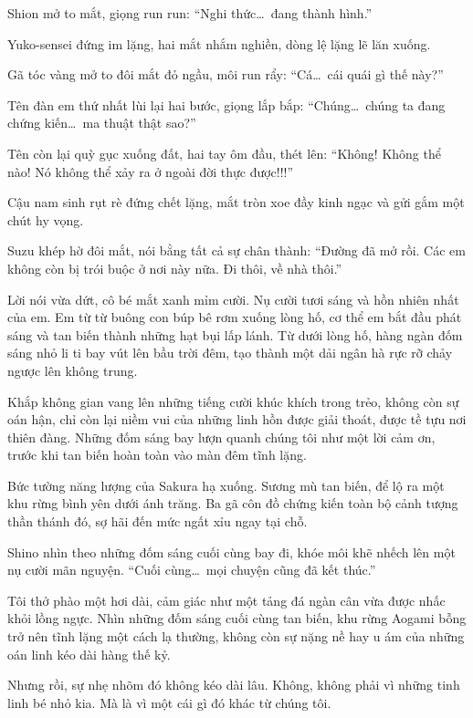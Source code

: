\documentclass[../main.tex]{subfiles}
\begin{document}
Shion mở to mắt, giọng run run: ``Nghi thức\dots\ đang thành hình.''

Yuko-sensei đứng im lặng, hai mắt nhắm nghiền, dòng lệ lặng lẽ lăn xuống.

Gã tóc vàng mở to đôi mắt đỏ ngầu, môi run rẩy: ``Cá\dots\ cái quái gì thế này?''

Tên đàn em thứ nhất lùi lại hai bước, giọng lắp bắp: ``Chúng\dots\ chúng ta đang chứng kiến\dots\ ma thuật thật sao?''

Tên còn lại quỳ gục xuống đất, hai tay ôm đầu, thét lên: ``Không! Không thể nào! Nó không thể xảy ra ở ngoài đời thực được!!!''

Cậu nam sinh rụt rè đứng chết lặng, mắt tròn xoe đầy kinh ngạc và gửi gắm một chút hy vọng.

Suzu khép hờ đôi mắt, nói bằng tất cả sự chân thành: ``Đường đã mở rồi. Các em không còn bị trói buộc ở nơi này nữa. Đi thôi, về nhà thôi.''

Lời nói vừa dứt, cô bé mắt xanh mỉm cười. Nụ cười tươi sáng và hồn nhiên nhất của em. Em từ từ buông con búp bê rơm xuống lòng hố, cơ thể em bắt đầu phát sáng và tan biến thành những hạt bụi lấp lánh. Từ dưới lòng hố, hàng ngàn đốm sáng nhỏ li ti bay vút lên bầu trời đêm, tạo thành một dải ngân hà rực rỡ chảy ngược lên không trung.

Khắp không gian vang lên những tiếng cười khúc khích trong trẻo, không còn sự oán hận, chỉ còn lại niềm vui của những linh hồn được giải thoát, được tề tựu nơi thiên đàng. Những đốm sáng bay lượn quanh chúng tôi như một lời cảm ơn, trước khi tan biến hoàn toàn vào màn đêm tĩnh lặng.

Bức tường năng lượng của Sakura hạ xuống. Sương mù tan biến, để lộ ra một khu rừng bình yên dưới ánh trăng. Ba gã côn đồ chứng kiến toàn bộ cảnh tượng thần thánh đó, sợ hãi đến mức ngất xỉu ngay tại chỗ.

Shino nhìn theo những đốm sáng cuối cùng bay đi, khóe môi khẽ nhếch lên một nụ cười mãn nguyện. ``Cuối cùng\dots\ mọi chuyện cũng đã kết thúc.''


Tôi thở phào một hơi dài, cảm giác như một tảng đá ngàn cân vừa được nhấc khỏi lồng ngực. Nhìn những đốm sáng cuối cùng tan biến, khu rừng Aogami bỗng trở nên tĩnh lặng một cách lạ thường, không còn sự nặng nề hay u ám của những oán linh kéo dài hàng thế kỷ.

Nhưng rồi, sự nhẹ nhõm đó không kéo dài lâu. Không, không phải vì những tinh linh bé nhỏ kia. Mà là vì một cái gì đó khác từ chúng tôi.
\end{document}
